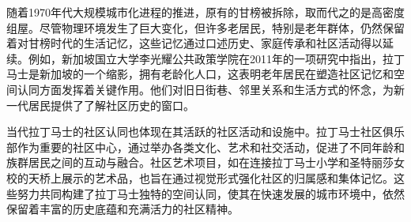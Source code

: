 \documentclass[11pt,a4paper,twoside,openany]{book}
\begin{document}
随着1970年代大规模城市化进程的推进，原有的甘榜被拆除，取而代之的是高密度组屋。尽管物理环境发生了巨大变化，但许多老居民，特别是老年群体，仍然保留着对甘榜时代的生活记忆，这些记忆通过口述历史、家庭传承和社区活动得以延续。例如，新加坡国立大学李光耀公共政策学院在2011年的一项研究中指出，拉丁马士是新加坡的一个缩影，拥有老龄化人口，这表明老年居民在塑造社区记忆和空间认同方面发挥着关键作用。他们对旧日街巷、邻里关系和生活方式的怀念，为新一代居民提供了了解社区历史的窗口。

当代拉丁马士的社区认同也体现在其活跃的社区活动和设施中。拉丁马士社区俱乐部作为重要的社区中心，通过举办各类文化、艺术和社交活动，促进了不同年龄和族群居民之间的互动与融合。社区艺术项目，如在连接拉丁马士小学和圣特丽莎女校的天桥上展示的艺术品，也旨在通过视觉形式强化社区的归属感和集体记忆。这些努力共同构建了拉丁马士独特的空间认同，使其在快速发展的城市环境中，依然保留着丰富的历史底蕴和充满活力的社区精神。
\end{document}

